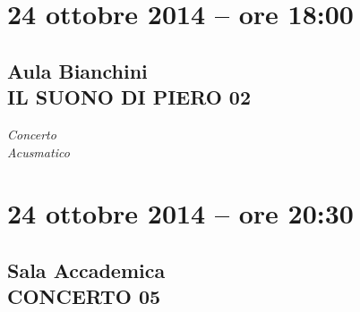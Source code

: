 \documentclass[8pt, twoside, a5paper]{extreport}
\begin{document}
\begin{Parallel}[c]{0.47\textwidth}{0.47\textwidth}
	\ParallelPar
	\clearpage


\section*{24 ottobre 2014 -- ore 18:00}
\subsection*{\textsf{Aula Bianchini\\
	{\small IL SUONO DI PIERO 02\\}}}

{\fontsize{50}{60}\selectfont \textit{Concerto\\ Acusmatico}}
\bigskip


\section*{}
	
	


	\ParallelPar
	\clearpage


\section*{24 ottobre 2014 -- ore 20:30}
\subsection*{\textsf{Sala Accademica\\
	{\small CONCERTO 05\\}}}


\end{Parallel}
\end{document}
